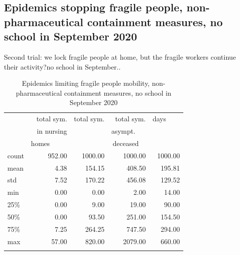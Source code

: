 \documentclass[graybox]{svmult}
\begin{document}
\subsection{Epidemics stopping fragile people, non-pharmaceutical containment measures, no school in September 2020}
\label{EpidemicsFragileS}


Second trial: we lock fragile people at home, but the fragile workers continue their activity?no school in September..

\begin{table}[t]
\center
\small
\begin{tabular}{lrrrr}
\hline\noalign{\smallskip}
{} & total sym.        &  total sym. & total sym.     & days~~~~ \\
{} & in nursing        &                  & asympt.~~~  & \\
{} & homes~~~~~  &                  & deceased~~ & \\
\noalign{\smallskip}\svhline\noalign{\smallskip}
count &     952.00 &             1000.00 &                 1000.00 & 1000.00 \\
mean  &       4.38 &              154.15 &                  408.50 &  195.81 \\
std   &       7.52 &              170.22 &                  456.08 &  129.52 \\
min   &       0.00 &                0.00 &                    2.00 &   14.00 \\
25\%   &       0.00 &                9.00 &                   19.00 &   90.00 \\
50\%   &       0.00 &               93.50 &                  251.00 &  154.50 \\
75\%   &       7.25 &              264.25 &                  747.50 &  294.00 \\
max   &      57.00 &              820.00 &                 2079.00 &  660.00 \\
\hline\noalign{\smallskip}
\end{tabular}

\label{EpidemicsFragileT}
\caption{Epidemics limiting fragile people mobility, non-pharmaceutical containment measures, no school in September 2020}
\end{table}
\end{document}
